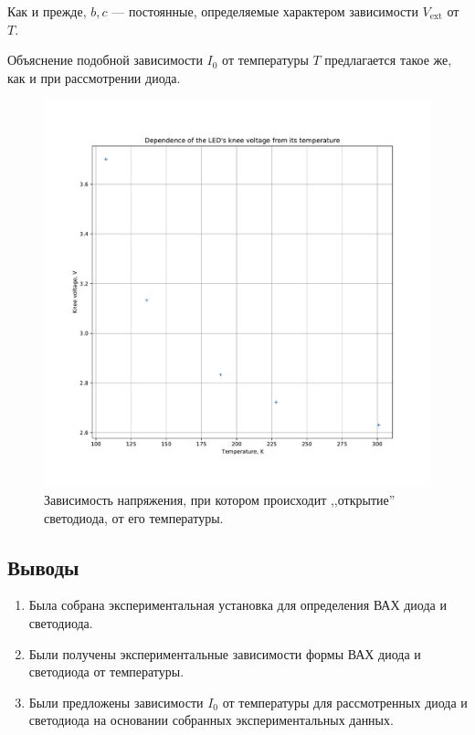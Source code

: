 \documentclass[a4paper, 12pt]{article}
\begin{document}
Как и прежде, $b, c$ --- постоянные, определяемые характером зависимости $V_{\text{ext}}$ от $T$.

Объяснение подобной зависимости $I_0$ от температуры $T$ предлагается такое же, как и при рассмотрении диода.

\begin{figure}[H]
	\centering
	\includegraphics[width=\linewidth]{2_Knee_LED}
	\caption{Зависимость напряжения, при котором происходит ,,открытие'' светодиода, от его температуры.}
	\label{fig:2_Knee_LED}
\end{figure}

\subsection{Выводы}

\begin{enumerate}
	\item Была собрана экспериментальная установка для определения ВАХ диода и светодиода.
	
	\item Были получены экспериментальные зависимости формы ВАХ диода и светодиода от температуры.
	
	\item Были предложены зависимости $I_0$ от температуры для рассмотренных диода и светодиода на основании собранных экспериментальных данных.
\end{enumerate}
\end{document}
